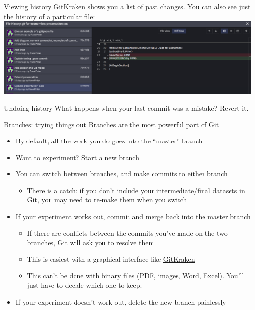 \documentclass{beamer}
\begin{document}
\begin{frame}{Viewing history}
GitKraken shows you a list of past changes. You can also see just the history of a particular file:
\includegraphics[width=\textwidth]{screenshots/history-diff.png}
\end{frame}

\begin{frame}{Undoing history}
What happens when your last commit was a mistake? Revert it.
\end{frame}

\begin{frame}{Branches: trying things out}
\href{https://git-scm.com/book/en/v2/Git-Branching-Branches-in-a-Nutshell}{Branches} are the most powerful part of Git
\begin{itemize}
\item By default, all the work you do goes into the ``master'' branch
\item Want to experiment? Start a new branch
\item You can switch between branches, and make commits to either branch
\begin{itemize}
\item There is a catch: if you don't include your intermediate/final datasets in Git, you may need to re-make them when you switch
\end{itemize}
\item If your experiment works out, commit and merge back into the master branch
\begin{itemize}
\item If there are conflicts between the commits you've made on the two branches, Git will ask you to resolve them
\item This is easiest with a graphical interface like \href{https://support.gitkraken.com/working-with-repositories/branching-and-merging/}{GitKraken}
\item This can't be done with binary files (PDF, images, Word, Excel). You'll just have to decide which one to keep.
\end{itemize}
\item If your experiment doesn't work out, delete the new branch painlessly
\end{itemize}
\end{frame}
\end{document}
